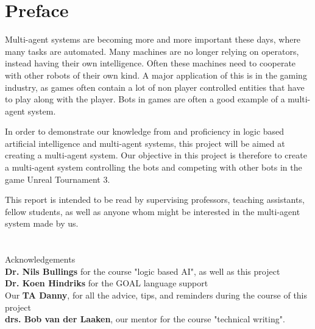 \chapter*{Preface}
Multi-agent systems are becoming more and more important these days, where many tasks are automated. Many machines are no longer relying on operators, instead having their own intelligence. Often these machines need to cooperate with other robots of their own kind. A major application of this is in the gaming industry, as games often contain a lot of non player controlled entities that have to play along with the player. Bots in games are often a good example of a multi-agent system.

In order to demonstrate our knowledge from and proficiency in logic based artificial intelligence and multi-agent systems, this project will be aimed at creating a multi-agent system. Our objective in this project is therefore to create a multi-agent system controlling the bots and competing with other bots in the game Unreal Tournament 3. 
    
This report is intended to be read by supervising professors, teaching assistants, fellow students, as well as anyone whom might be interested in the multi-agent system made by us.
\\
\\
\\
Acknowledgements \\
    \textbf{Dr. Nils Bullings} for the course "logic based AI", as well as this project \\
    \textbf{Dr. Koen Hindriks} for the GOAL language support \\
    Our \textbf{TA Danny}, for all the advice, tips, and reminders during the course of this project \\
    \textbf{drs. Bob van der Laaken}, our mentor for the course "technical writing". \\
